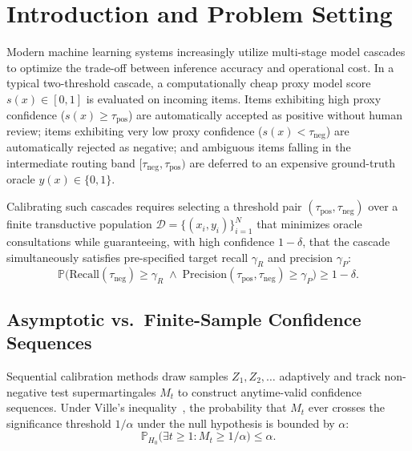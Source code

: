 \documentclass[11pt,a4paper]{article}
\begin{document}
\tableofcontents
\newpage

\section{Introduction and Problem Setting}

Modern machine learning systems increasingly utilize multi-stage model cascades to optimize the trade-off between inference accuracy and operational cost. In a typical two-threshold cascade, a computationally cheap proxy model score $s(x) \in [0, 1]$ is evaluated on incoming items. Items exhibiting high proxy confidence ($s(x) \ge \tau_{\text{pos}}$) are automatically accepted as positive without human review; items exhibiting very low proxy confidence ($s(x) < \tau_{\text{neg}}$) are automatically rejected as negative; and ambiguous items falling in the intermediate routing band $[\tau_{\text{neg}}, \tau_{\text{pos}})$ are deferred to an expensive ground-truth oracle $y(x) \in \{0, 1\}$.

Calibrating such cascades requires selecting a threshold pair $(\tau_{\text{pos}}, \tau_{\text{neg}})$ over a finite transductive population $\mathcal{D} = \{(x_i, y_i)\}_{i=1}^N$ that minimizes oracle consultations while guaranteeing, with high confidence $1 - \delta$, that the cascade simultaneously satisfies pre-specified target recall $\gamma_R$ and precision $\gamma_P$:
\begin{equation}\label{eq:joint_guarantee}
\mathbb{P}\Big( \text{Recall}(\tau_{\text{neg}}) \ge \gamma_R \;\land\; \text{Precision}(\tau_{\text{pos}}, \tau_{\text{neg}}) \ge \gamma_P \Big) \ge 1 - \delta.
\end{equation}

\subsection{Asymptotic vs.\ Finite-Sample Confidence Sequences}
Sequential calibration methods draw samples $Z_1, Z_2, \dots$ adaptively and track non-negative test supermartingales $M_t$ to construct anytime-valid confidence sequences. Under Ville's inequality~\cite{ville1939etude}, the probability that $M_t$ ever crosses the significance threshold $1/\alpha$ under the null hypothesis is bounded by $\alpha$:
\begin{equation}\label{eq:ville_ineq}
\mathbb{P}_{H_0}\big(\exists t \ge 1 : M_t \ge 1/\alpha\big) \le \alpha.
\end{equation}
\end{document}
